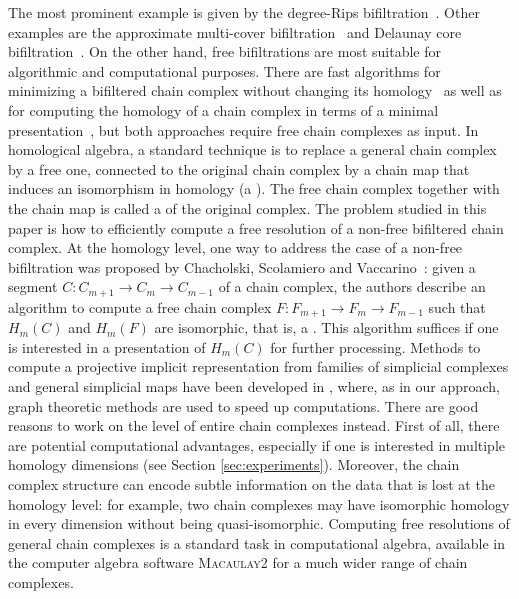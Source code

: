 The most prominent example is given by the degree-Rips bifiltration~\cite{lw-rivet,rolle-socg,rs-stable,bl-stability}.
Other examples
are the approximate multi-cover bifiltration~\cite{alonso-sparse} and Delaunay core bifiltration~\cite{Core_bifilt}.
On the other hand, free bifiltrations are most suitable for algorithmic and computational purposes.
There are fast algorithms for minimizing a bifiltered chain complex without changing its homology~\cite{fk-chunk,fkr-compression,ms-computing}
as well as for computing the homology of a chain complex in terms of a minimal presentation~\cite{lw-computing,kr-fast,fkr-compression,bll-efficient}, 
but both approaches require free chain complexes as input. 
%
%
In homological algebra, a standard technique is to replace a general chain complex by a free one, connected to the original chain complex by a chain map that induces an isomorphism in homology (a ).
The free chain complex together with the chain map is called a  of the original complex.
The problem studied in this paper is how to efficiently compute a free resolution of a non-free bifiltered chain complex. 
%
At the homology level, one way to address the case of a non-free bifiltration was proposed by Chacholski,
Scolamiero and Vaccarino~\cite{swedish}: given a segment  $C:C_{m+1}\to C_m\to C_{m-1}$ of a chain complex, the authors describe an algorithm to compute a free chain complex
$F:F_{m+1}\to F_m\to F_{m-1}$ such that $H_m(C)$ and $H_m(F)$ are isomorphic, that is, a .
This algorithm suffices if one is interested in a presentation
of $H_m(C)$ for further processing. Methods to compute a projective implicit representation from families of simplicial complexes and general simplicial maps have been developed in \cite{dey2025computingprojectiveimplicitrepresentations,dey_et_al:LIPIcs.SoCG.2024.51}, where, as in our approach, graph theoretic methods are used to speed up computations.
%
There are good reasons to work on the level of entire chain complexes instead.
First of all, there are potential computational advantages, especially if one is interested in multiple homology dimensions (see Section \ref{sec:experiments}). 
Moreover, the chain complex structure can encode subtle information on the data that is lost at the homology level: for example, two chain complexes may have isomorphic homology in every dimension without being quasi-isomorphic. 
%
Computing free resolutions of general chain complexes is a standard task in computational algebra, available in the computer algebra software \textsc{Macaulay2} for a much wider range of chain complexes.
